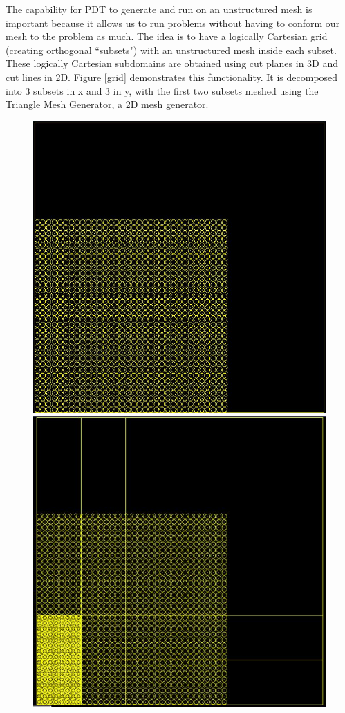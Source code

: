 \documentclass{anstrans}
\begin{document}
The capability for PDT to generate and run on an unstructured mesh is important because it allows us to run problems without having to conform our mesh to the problem as much. The idea is to have a logically Cartesian grid (creating orthogonal ``subsets") with an unstructured mesh inside each subset. These logically Cartesian subdomains are obtained using cut planes in 3D and cut lines in 2D. Figure \ref{grid} demonstrates this functionality. It is decomposed into 3 subsets in x and 3 in y, with the first two subsets meshed using the Triangle Mesh Generator\cite{triangle}, a 2D mesh generator.

\begin{figure}[H]
\centering
\includegraphics[scale = 0.45]{figures/lattice.png}
\includegraphics[scale = 0.45]{figures/subsetlattice.png}

\end{figure}
\end{document}
